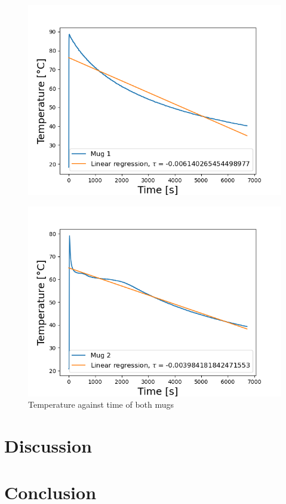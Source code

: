 \documentclass[reprint,english,notitlepage]{revtex4-2}
\begin{document}
\begin{figure}
  \includegraphics[scale=0.5]{tau_t.png}
  \caption{}\label{figure}
\end{figure}

\begin{figure}
  \includegraphics[scale=0.5]{tau_b.png}
  \caption{Temperature against time of both mugs}\label{figure}
\end{figure}

\section{Discussion}
\section{Conclusion}
\end{document}
